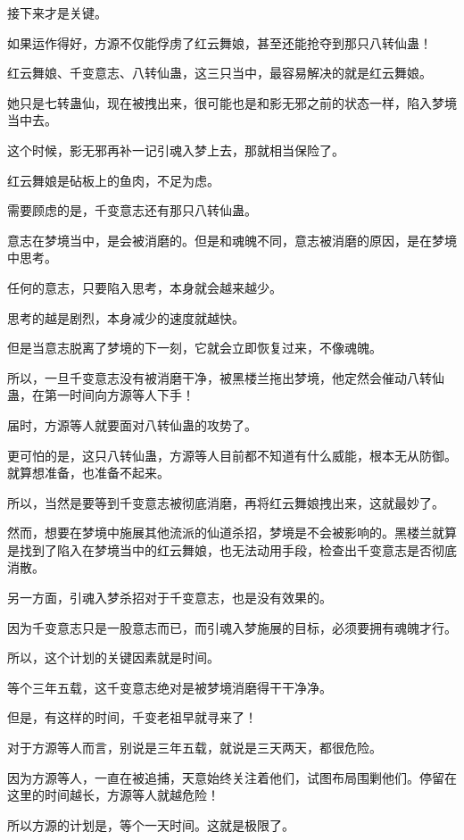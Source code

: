 \begin{this_body}
接下来才是关键。

如果运作得好，方源不仅能俘虏了红云舞娘，甚至还能抢夺到那只八转仙蛊！

红云舞娘、千变意志、八转仙蛊，这三只当中，最容易解决的就是红云舞娘。

她只是七转蛊仙，现在被拽出来，很可能也是和影无邪之前的状态一样，陷入梦境当中去。

这个时候，影无邪再补一记引魂入梦上去，那就相当保险了。

红云舞娘是砧板上的鱼肉，不足为虑。

需要顾虑的是，千变意志还有那只八转仙蛊。

意志在梦境当中，是会被消磨的。但是和魂魄不同，意志被消磨的原因，是在梦境中思考。

任何的意志，只要陷入思考，本身就会越来越少。

思考的越是剧烈，本身减少的速度就越快。

但是当意志脱离了梦境的下一刻，它就会立即恢复过来，不像魂魄。

所以，一旦千变意志没有被消磨干净，被黑楼兰拖出梦境，他定然会催动八转仙蛊，在第一时间向方源等人下手！

届时，方源等人就要面对八转仙蛊的攻势了。

更可怕的是，这只八转仙蛊，方源等人目前都不知道有什么威能，根本无从防御。就算想准备，也准备不起来。

所以，当然是要等到千变意志被彻底消磨，再将红云舞娘拽出来，这就最妙了。

然而，想要在梦境中施展其他流派的仙道杀招，梦境是不会被影响的。黑楼兰就算是找到了陷入在梦境当中的红云舞娘，也无法动用手段，检查出千变意志是否彻底消散。

另一方面，引魂入梦杀招对于千变意志，也是没有效果的。

因为千变意志只是一股意志而已，而引魂入梦施展的目标，必须要拥有魂魄才行。

所以，这个计划的关键因素就是时间。

等个三年五载，这千变意志绝对是被梦境消磨得干干净净。

但是，有这样的时间，千变老祖早就寻来了！

对于方源等人而言，别说是三年五载，就说是三天两天，都很危险。

因为方源等人，一直在被追捕，天意始终关注着他们，试图布局围剿他们。停留在这里的时间越长，方源等人就越危险！

所以方源的计划是，等个一天时间。这就是极限了。


\end{this_body}
